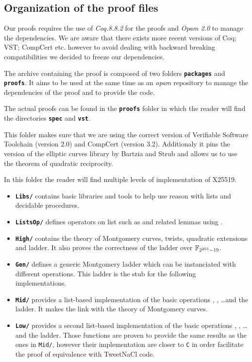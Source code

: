 \subsection{Organization of the proof files}
\label{appendix:proof-folders}

Our proofs requires the use of \emph{Coq.8.8.2} for the proofs and
\emph{Opam 2.0} to manage the dependencies. We are aware that there exists more
recent versions of Coq; VST; CompCert etc. however to avoid dealing with backward
breaking compatibilities we decided to freeze our dependencies.

The archive containing the proof is composed of two folders \textbf{\texttt{packages}}
and \textbf{\texttt{proofs}}.
It aims to be used at the same time as an \emph{opam} repository to manage
the dependencies of the proof and to provide the code.

The actual proofs can be found in the \textbf{\texttt{proofs}} folder in which
the reader will find the directories \textbf{\texttt{spec}} and \textbf{\texttt{vst}}.

This folder makes sure that we are using the correct version of
Verifiable Software Toolchain (version 2.0) and CompCert (version 3.2).
Additionaly it pins the version of the elliptic curves library by Bartzia and Strub
and allows us to use the theorem of quadratic reciprocity.

In this folder the reader will find multiple levels of implementation of X25519.
\begin{itemize}
  \item \textbf{\texttt{Libs/}} contains basic libraries and tools to help use
  reason with lists and decidable procedures.
  \item \textbf{\texttt{ListsOp/}} defines operators on list such as
   and related lemmas using \eg {}.
  \item \textbf{\texttt{High/}} contains the theory of Montgomery curves,
  twists, quadratic extensions and ladder.
  It also proves the correctness of the ladder over $\mathbb{F}_{2^{255}-19}$.
  \item \textbf{\texttt{Gen/}} defines a generic Montgomery ladder which can be
  instanciated with different operations. This ladder is the stub for the
  following implementations.
  \item \textbf{\texttt{Mid/}} provides a list-based implementation of the
  basic operations , ,  \ldots and the ladder. It
  makes the link with the theory of Montgomery curves.
  \item \textbf{\texttt{Low/}} provides a second list-based implementation of
  the basic operations , ,  \ldots and the ladder.
  Those functions are proven to provide the same results as the ones in
  \texttt{Mid/}, however their implementation are closer to \texttt{C} in order
  facilitate the proof of equivalence with TweetNaCl code.
\end{itemize}

